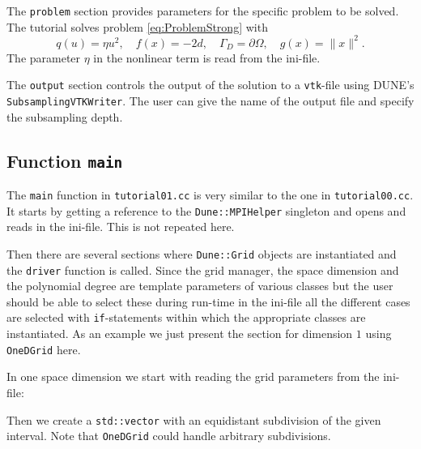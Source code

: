 \documentclass[a4paper,12pt]{article}
\begin{document}

The \lstinline{problem} section provides parameters for the
specific problem to be solved. The tutorial solves problem \eqref{eq:ProblemStrong}
with $$q(u)=\eta u^2, \quad f(x) = -2d, \quad \Gamma_D=\partial\Omega,
\quad g(x)=\|x\|^2 .$$
The parameter $\eta$ in the nonlinear term is read from the ini-file.


The \lstinline{output} section controls the output of the solution
to a \lstinline{vtk}-file using DUNE's \lstinline{SubsamplingVTKWriter}.
The user can give the name of the output file and specify the subsampling depth.

\subsection{Function \lstinline{main}}

The \lstinline{main} function  in \lstinline{tutorial01.cc} is very similar to the one
in \lstinline{tutorial00.cc}. It starts by getting a reference to the
\lstinline{Dune::MPIHelper} singleton and opens and reads in the ini-file. 
This is not repeated here.

Then there are several sections where \lstinline{Dune::Grid} objects are instantiated
and the \lstinline{driver} function is called. Since the grid manager, the space
dimension and the polynomial degree are template parameters of various classes
but the user should be able to select these during run-time in the ini-file all 
the different cases are selected with \lstinline{if}-statements within which
the appropriate classes are instantiated. As an example we just
present the section for dimension $1$ using \lstinline{OneDGrid} here.

In one space dimension we start with reading the grid parameters 
from the ini-file:


Then we create a \lstinline{std::vector} with an equidistant
subdivision of the given interval. Note that \lstinline{OneDGrid}
could handle arbitrary subdivisions.

\end{document}

